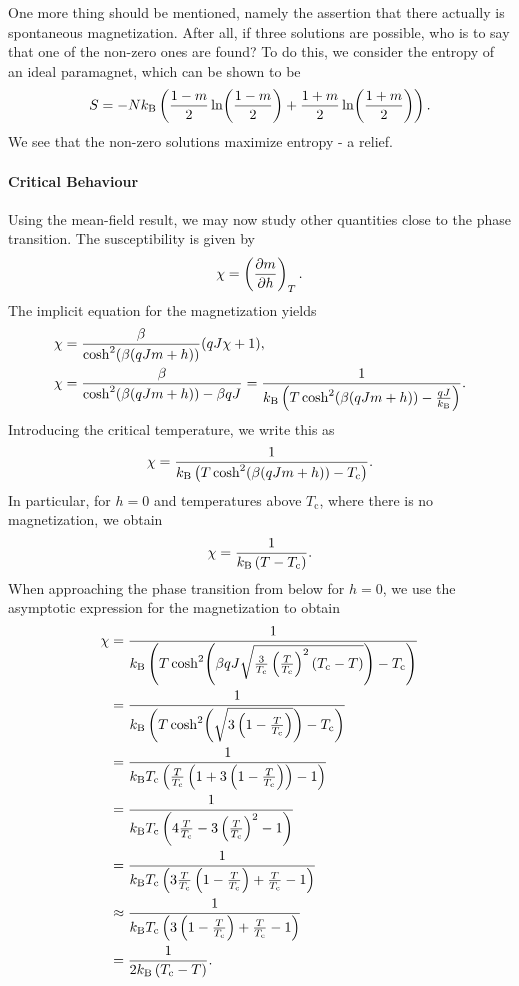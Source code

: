 One more thing should be mentioned, namely the assertion that there actually is spontaneous magnetization. After all, if three solutions are possible, who is to say that one of the non-zero ones are found? To do this, we consider the entropy of an ideal paramagnet, which can be shown to be
\begin{align*}
	S = -Nk_{\text{B}}\left(\frac{1 - m}{2}\ln(\frac{1 - m}{2}) + \frac{1 + m}{2}\ln(\frac{1 + m}{2})\right).
\end{align*}
We see that the non-zero solutions maximize entropy - a relief.

\paragraph{Critical Behaviour}
Using the mean-field result, we may now study other quantities close to the phase transition. The susceptibility is given by
\begin{align*}
	\chi = \left(\pdv{m}{h}\right)_{T}.
\end{align*}
The implicit equation for the magnetization yields
\begin{align*}
	\chi &= \frac{\beta}{\cosh[2](\beta(qJm + h))}(qJ\chi + 1), \\
	\chi &= \frac{\beta}{\cosh[2](\beta(qJm + h)) - \beta qJ} = \frac{1}{k_{\text{B}} \left(T\cosh[2](\beta(qJm + h)) - \frac{qJ}{k_{\text{B}}}\right)}.
\end{align*}
Introducing the critical temperature, we write this as
\begin{align*}
	\chi = \frac{1}{k_{\text{B}} \left(T\cosh[2](\beta(qJm + h)) - T_{\text{c}}\right)}.
\end{align*}
In particular, for $h = 0$ and temperatures above $T_{\text{c}}$, where there is no magnetization, we obtain
\begin{align*}
	\chi = \frac{1}{k_{\text{B}}\left(T - T_{\text{c}}\right)}.
\end{align*}
When approaching the phase transition from below for $h = 0$, we use the asymptotic expression for the magnetization to obtain
\begin{align*}
	\chi &= \frac{1}{k_{\text{B}} \left(T\cosh[2](\beta qJ\sqrt{\frac{3}{T_{\text{c}}}\left(\frac{T}{T_{\text{c}}}\right)^{2}\left(T_{\text{c}} - T\right)}) - T_{\text{c}}\right)} \\
	     &= \frac{1}{k_{\text{B}} \left(T\cosh[2](\sqrt{3\left(1 - \frac{T}{T_{\text{c}}}\right)}) - T_{\text{c}}\right)} \\
	     &= \frac{1}{k_{\text{B}} T_{\text{c}}\left(\frac{T}{T_{\text{c}}}\left(1 + 3\left(1 - \frac{T}{T_{\text{c}}}\right)\right) - 1\right)} \\
	     &=	\frac{1}{k_{\text{B}} T_{\text{c}}\left(4\frac{T}{T_{\text{c}}} - 3\left(\frac{T}{T_{\text{c}}}\right)^{2} - 1\right)} \\
	     &= \frac{1}{k_{\text{B}} T_{\text{c}}\left(3\frac{T}{T_{\text{c}}}\left(1 - \frac{T}{T_{\text{c}}}\right) + \frac{T}{T_{\text{c}}} - 1\right)} \\
	     &\approx \frac{1}{k_{\text{B}} T_{\text{c}}\left(3\left(1 - \frac{T}{T_{\text{c}}}\right) + \frac{T}{T_{\text{c}}} - 1\right)} \\
	     &= \frac{1}{2k_{\text{B}}\left(T_{\text{c}} - T\right)}.
\end{align*}

